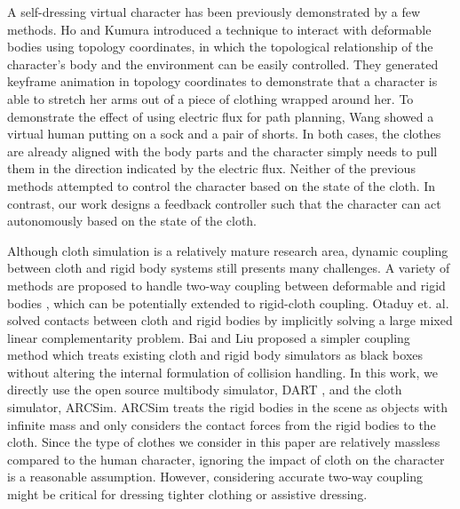 A self-dressing virtual character has been previously demonstrated by a few methods. Ho and Kumura  introduced a technique to interact with deformable bodies using topology coordinates, in which the topological relationship of the character's body and the environment can be easily controlled. They generated keyframe animation in topology coordinates to demonstrate that a character is able to stretch her arms out of a piece of clothing wrapped around her. To demonstrate the effect of using electric flux for path planning, Wang \etal {} showed a virtual human putting on a sock and a pair of shorts. In both cases, the clothes are already aligned with the body parts and the character simply needs to pull them in the direction indicated by the electric flux. Neither of the previous methods attempted to control the character based on the state of the cloth. In contrast, our work designs a feedback controller such that the character can act autonomously based on the state of the cloth.


Although cloth simulation is a relatively mature research area, dynamic coupling between cloth and rigid body systems still presents many challenges. A variety of methods are proposed to handle two-way coupling between deformable and rigid bodies \cite{Jansson:2003:CDR,Sifakis:2007:HSD,Shinar:2008:TCR,Otaduy:2009:ICH,Miguel:2011:ESC}, which can be potentially extended to rigid-cloth coupling. Otaduy et. al. \cite{Otaduy:2009:ICH} solved contacts between cloth and rigid bodies by implicitly solving a large mixed linear complementarity problem. Bai and Liu \cite{Bai:2014:CCR} proposed a simpler coupling method which treats existing cloth and rigid body simulators as black boxes without altering the internal formulation of collision handling. In this work, we directly use the open source multibody simulator, DART \cite{Liu:2012:STM}, and the cloth simulator, ARCSim\cite{Narain:2012:AAR,Narain:2013:FCA}. ARCSim treats the rigid bodies in the scene as objects with infinite mass and only considers the contact forces from the rigid bodies to the cloth. Since the type of clothes we consider in this paper are relatively massless compared to the human character, ignoring the impact of cloth on the character is a reasonable assumption. However, considering accurate two-way coupling might be critical for dressing tighter clothing or assistive dressing.

